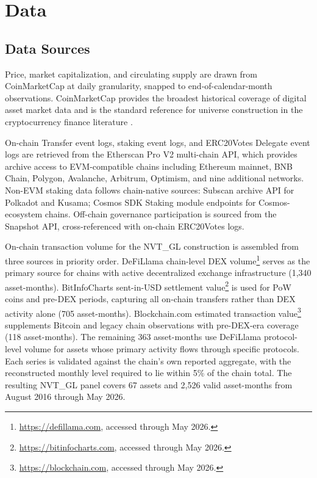 \documentclass[12pt]{article}
\begin{document}
\section{Data}
\label{sec:data}

\subsection{Data Sources}
\label{sec:data_sources}

Price, market capitalization, and circulating supply are drawn from CoinMarketCap at
daily granularity, snapped to end-of-calendar-month observations. CoinMarketCap provides
the broadest historical coverage of digital asset market data and is the standard
reference for universe construction in the cryptocurrency finance literature
\citep{liu2022common,makarov2020trading}.

On-chain Transfer event logs, staking event logs, and ERC20Votes Delegate event logs
are retrieved from the Etherscan Pro V2 multi-chain API, which provides archive access
to EVM-compatible chains including Ethereum mainnet, BNB Chain, Polygon, Avalanche,
Arbitrum, Optimism, and nine additional networks. Non-EVM staking data follows
chain-native sources: Subscan archive API for Polkadot and Kusama; Cosmos SDK Staking
module endpoints for Cosmos-ecosystem chains. Off-chain governance participation is
sourced from the Snapshot API, cross-referenced with on-chain ERC20Votes logs.

On-chain transaction volume for the NVT\_GL construction is assembled from three sources
in priority order. DeFiLlama chain-level DEX
volume\footnote{\url{https://defillama.com}, accessed through May 2026.}
serves as the primary source for chains with active decentralized exchange infrastructure
(1,340 asset-months). BitInfoCharts sent-in-USD settlement
value\footnote{\url{https://bitinfocharts.com}, accessed through May 2026.}
is used for PoW coins and pre-DEX periods, capturing all on-chain transfers rather than
DEX activity alone (705 asset-months). Blockchain.com estimated transaction
value\footnote{\url{https://blockchain.com}, accessed through May 2026.}
supplements Bitcoin and legacy chain observations with pre-DEX-era coverage (118
asset-months). The remaining 363 asset-months use DeFiLlama protocol-level volume for
assets whose primary activity flows through specific protocols. Each series is validated
against the chain's own reported aggregate, with the reconstructed monthly level required
to lie within 5\% of the chain total. The resulting NVT\_GL panel covers 67 assets and
2,526 valid asset-months from August 2016 through May 2026.
\end{document}
